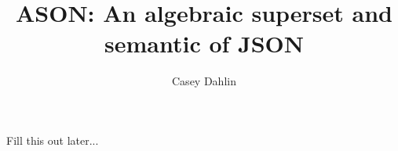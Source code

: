 \documentclass{article}
\title{ASON: An algebraic superset and semantic of JSON}
\author{Casey Dahlin}
\begin{document}
\maketitle
Fill this out later...
\end{document}
